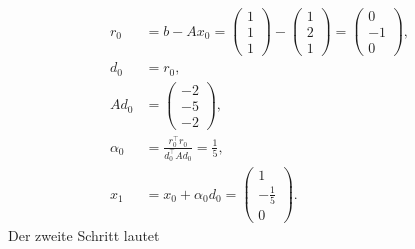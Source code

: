 \documentclass[english, parskip=full]{scrartcl}
\begin{document}
\begin{align}
r_0 &= b - Ax_0 = \begin{pmatrix}
1 \\ 1 \\ 1
\end{pmatrix} - \begin{pmatrix}
1 \\ 2 \\ 1
\end{pmatrix} = \begin{pmatrix}
0 \\ -1 \\ 0
\end{pmatrix},\\
d_0 &= r_0,\\
Ad_0 &= \begin{pmatrix}
-2 \\ -5 \\ -2
\end{pmatrix},\\
\alpha_0 &= \frac{r_0^\top r_0}{d_0^\top Ad_0} = \frac{1}{5},\\
x_1 &= x_0 + \alpha_0d_0 = \begin{pmatrix}
1 \\ -\frac{1}{5} \\ 0
\end{pmatrix}.
\end{align}
Der zweite Schritt lautet
\end{document}
